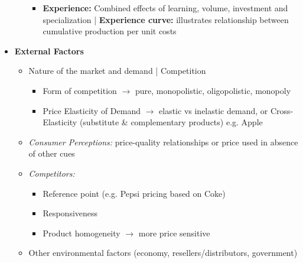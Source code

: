 \documentclass[10pt,landscape]{article}
\begin{document}
\begin{multicols*}{3}
\begin{itemize}[topsep=0pt,noitemsep,wide=0pt, leftmargin=\dimexpr{} + 2\relax]
\begin{itemize}[topsep=0pt,noitemsep,wide=0pt, leftmargin=\dimexpr{} + 2\relax]
        \begin{itemize}[topsep=0pt,noitemsep,wide=0pt, leftmargin=\dimexpr{} + 2\relax]
            \item \textbf{Experience:} Combined effects of learning, volume, investment and specialization | \textbf{Experience curve:} illustrates relationship between cumulative production per unit costs
        \end{itemize}
    \end{itemize}
    \item \textbf{External Factors}
    \begin{itemize}[topsep=0pt,noitemsep,wide=0pt, leftmargin=\dimexpr{} + 2\relax]
        \item Nature of the market and demand | Competition
        \begin{itemize}[topsep=0pt,noitemsep,wide=0pt, leftmargin=\dimexpr{} + 2\relax]
            \item Form of competition $\rightarrow$ pure, monopolistic, oligopolistic, monopoly
            \item Price Elasticity of Demand $\rightarrow$ elastic vs inelastic demand, or Cross-Elasticity (substitute \& complementary products) e.g. Apple
        \end{itemize}
        \item \textit{Consumer Perceptions:} price-quality relationships or price used in absence of other cues
        \item \textit{Competitors:} 
        \begin{itemize}[topsep=0pt,noitemsep,wide=0pt, leftmargin=\dimexpr{} + 2\relax]
            \item Reference point (e.g. Pepsi pricing based on Coke)
            \item Responsiveness
            \item Product homogeneity $\rightarrow$ more price sensitive
        \end{itemize}
        \item Other environmental factors (economy, resellers/distributors, government)
    \end{itemize}
\end{itemize}


\end{multicols*}
\end{document}
